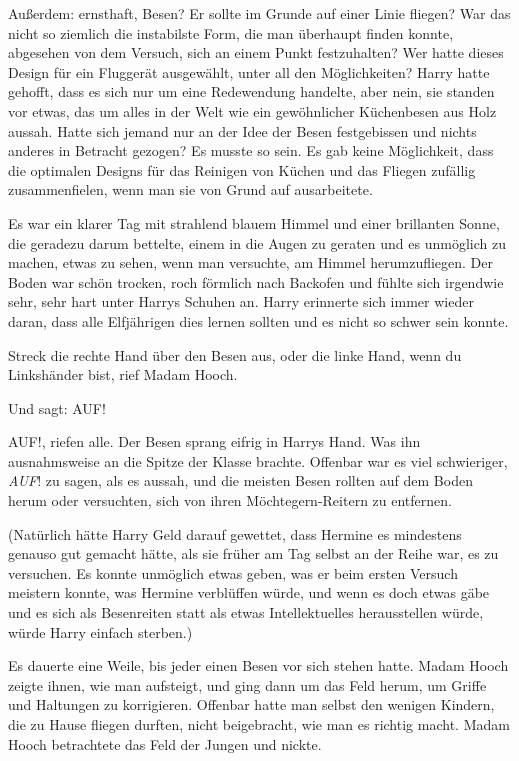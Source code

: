 Außerdem: ernsthaft, Besen? Er sollte im Grunde auf einer Linie fliegen? War das
nicht so ziemlich die instabilste Form, die man überhaupt finden konnte,
abgesehen von dem Versuch, sich an einem Punkt festzuhalten? Wer hatte dieses
Design für ein Fluggerät ausgewählt, unter all den Möglichkeiten? Harry hatte
gehofft, dass es sich nur um eine Redewendung handelte, aber nein, sie standen
vor etwas, das um alles in der Welt wie ein gewöhnlicher Küchenbesen aus Holz
aussah. Hatte sich jemand nur an der Idee der Besen festgebissen und nichts
anderes in Betracht gezogen? Es musste so sein. Es gab keine Möglichkeit, dass
die optimalen Designs für das Reinigen von Küchen und das Fliegen zufällig
zusammenfielen, wenn man sie von Grund auf ausarbeitete.

Es war ein klarer Tag mit strahlend blauem Himmel und einer brillanten Sonne,
die geradezu darum bettelte, einem in die Augen zu geraten und es unmöglich zu
machen, etwas zu sehen, wenn man versuchte, am Himmel herumzufliegen. Der Boden
war schön trocken, roch förmlich nach Backofen und fühlte sich irgendwie sehr,
sehr hart unter Harrys Schuhen an. Harry erinnerte sich immer wieder daran, dass
alle Elfjährigen dies lernen sollten und es nicht so schwer sein konnte.

\glqq{}Streck die rechte Hand über den Besen aus, oder die linke Hand, wenn du
Linkshänder bist\grqq{}, rief Madam Hooch.

\glqq{}Und sagt: AUF!\grqq{}

\glqq{}AUF!\grqq{}, riefen alle. Der Besen sprang eifrig in Harrys Hand. Was ihn
ausnahmsweise an die Spitze der Klasse brachte. Offenbar war es viel
schwieriger, \glqq{}\emph{AUF}!\grqq{} zu sagen, als es aussah, und die meisten
Besen rollten auf dem Boden herum oder versuchten, sich von ihren
Möchtegern-Reitern zu entfernen.

(Natürlich hätte Harry Geld darauf gewettet, dass Hermine es mindestens genauso
gut gemacht hätte, als sie früher am Tag selbst an der Reihe war, es zu
versuchen. Es konnte unmöglich etwas geben, was er beim ersten Versuch meistern
konnte, was Hermine verblüffen würde, und wenn es doch etwas gäbe und es sich
als Besenreiten statt als etwas Intellektuelles herausstellen würde, würde Harry
einfach sterben.)

Es dauerte eine Weile, bis jeder einen Besen vor sich stehen hatte. Madam Hooch
zeigte ihnen, wie man aufsteigt, und ging dann um das Feld herum, um Griffe und
Haltungen zu korrigieren. Offenbar hatte man selbst den wenigen Kindern, die zu
Hause fliegen durften, nicht beigebracht, wie man es richtig macht. Madam Hooch
betrachtete das Feld der Jungen und nickte.

